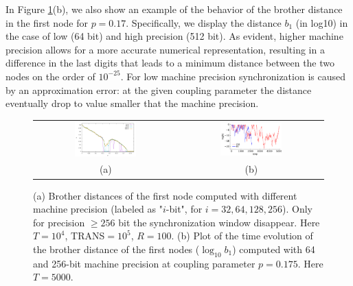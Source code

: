 \documentclass[runningheads]{llncs}
\begin{document}
In Figure \ref{fig:precision}(b), we also show an example of the behavior of the brother distance in the first node for $p=0.17$. Specifically, we display the distance $b_1$ (in log10) in the case of low (64 bit) and high precision (512 bit). As evident, higher machine precision allows for a more accurate numerical representation, resulting in a difference in the last digits that leads to a minimum distance between the two nodes on the order of $10^{-25}$. For low machine precision synchronization is caused by an approximation error: at the given coupling parameter the distance eventually drop to value smaller that the machine precision.\\

\begin{figure}
    \centering
    \begin{tabular}{c c}
        \includegraphics[width=0.45\textwidth]{distancelogistic_Precision.pdf} & 
        \includegraphics[width=0.45\textwidth]{logisticLogAbsDistanceBrother1.pdf} \\
         (a) & (b)  
    \end{tabular}
    \caption{(a) Brother distances of the first node computed with different machine precision (labeled as "$i$-bit", for $i = 32, 64, 128, 256$). Only for precision $\geq 256$ bit the synchronization window disappear. Here $T=10^4$, TRANS$=10^5$, $R=100$.
    (b) Plot of the time evolution of the brother distance of the first nodes ($\log_{10}b_1$) computed with 64 and 256-bit machine precision at coupling parameter $p=0.175$. Here $T=5000$.}
    \label{fig:precision}
\end{figure}
\end{document}

